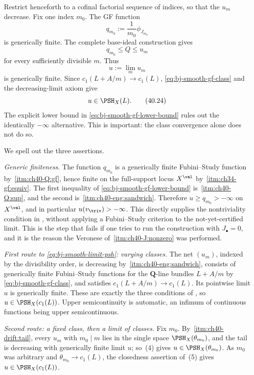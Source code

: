 Restrict henceforth to a cofinal factorial sequence of indices, so that
the $u_m$ decrease.  Fix one index $m_0$.  The GF function
\[
                         q_{m_0}:=\frac1{m_0}\phi_{J_{m_0}}
\]
is generically finite.  The complete base-ideal construction gives
\[
                         q_{m_0}\le Q\le u_m
\tag{40.22}\label{eq:bj-smooth-gf-lower-bound}
\]
for every sufficiently divisible $m$.  Thus
\[
                             u:=\lim_m u_m
\tag{40.23}\label{eq:bj-smooth-limit}
\]
is generically finite.  Since $c_1(L+A/m)\to c_1(L)$,
\eqref{eq:bj-smooth-gf-class} and the decreasing-limit axiom give
\[
                              u\in\PSH_X(L).
\tag{40.24}\label{eq:bj-smooth-limit-psh}
\]
The explicit lower bound in \eqref{eq:bj-smooth-gf-lower-bound} rules out
the identically $-\infty$ alternative.  This is important: the class
convergence alone does not do so.

We spell out the three assertions.

\emph{Generic finiteness.}  The function $q_{m_0}$ is a generically finite
Fubini--Study function by
\,\cref{itm:ch40-Q:gf}, hence finite on the
full-support locus $X^{\val}$ by
\,\cref{itm:ch34-gf:equiv}.  The first
inequality of \eqref{eq:bj-smooth-gf-lower-bound} is
\,\cref{itm:ch40-Q:sup}, and the second is
\,\cref{itm:ch40-eng:sandwich}.  Therefore
$u\ge q_{m_0}>-\infty$ on $X^{\val}$, and in particular
$u(v_{\triv})>-\infty$.  This directly supplies the nontriviality
condition in , without applying a Fubini--Study
criterion to the not-yet-certified limit.  This is the step that fails if one tries to run the
construction with $J_\bullet=0$, and it is the reason the Veronese of
\,\cref{itm:ch40-J:nonzero} was performed.

\emph{First route to \eqref{eq:bj-smooth-limit-psh}: varying classes.}  The
net $(u_m)$, indexed by the divisibility order, is decreasing by
\,\cref{itm:ch40-eng:sandwich}, consists of
generically finite Fubini--Study functions for the $\mathbf Q$-line
bundles $L+A/m$ by \eqref{eq:bj-smooth-gf-class}, and satisfies
$c_1(L+A/m)\to c_1(L)$.  Its pointwise limit $u$ is generically finite.
These are exactly the three conditions of , so
$u\in\PSH_X(c_1(L))$.  Upper semicontinuity is automatic, an infimum of
continuous functions being upper semicontinuous.

\emph{Second route: a fixed class, then a limit of classes.}  Fix $m_0$.
By \,\cref{itm:ch40-drift:tail}, every
$u_m$ with $m_0\mid m$ lies in the single space
$\PSH_X(\theta_{m_0})$, and the tail is decreasing with generically finite
limit $u$; so \,(4) gives
$u\in\PSH_X(\theta_{m_0})$.  As $m_0$ was arbitrary and
$\theta_{m_0}\to c_1(L)$, the closedness assertion of
\,(5) gives $u\in\PSH_X(c_1(L))$.

